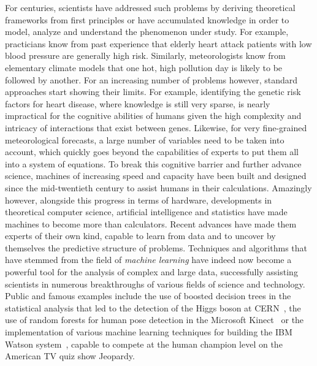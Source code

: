 For centuries, scientists have addressed such problems by deriving theoretical
frameworks from first principles or have accumulated knowledge in order to
model, analyze and understand the pheno\-menon under study. For example,
practicians know from past experience that elderly heart attack patients with
low blood pressure are generally high risk. Similarly, meteorologists know from
elementary climate models that one hot, high pollution day is likely to be
followed by another. For an increasing number of problems however, standard
approaches start showing their limits. For example, identifying the genetic
risk factors for heart disease, where knowledge is still very sparse, is nearly
impractical for the cognitive abilities of humans given the high complexity and
intricacy of interactions that exist between genes. Likewise, for very
fine-grained meteorological forecasts, a large number of variables need to be taken
into account, which quickly goes beyond the capabilities of experts to put them
all into a system of equations. To break this cognitive barrier and further
advance science, machines of increasing speed and capacity have been built and
designed since the mid-twentieth century to assist humans in their
calculations. Amazingly however, alongside this progress in terms of hardware,
developments in theoretical computer science, artificial intelligence and
statistics have made machines to become more than calculators. Recent advances
have made them experts of their own kind, capable to learn from data and to
uncover by themselves the predictive structure of problems. Techniques and
algorithms that have stemmed from the field of {\it machine learning} have
indeed now become a powerful tool for the analysis of complex and large data,
successfully assisting scientists in numerous breakthroughs of various fields
of science and technology. Public and famous examples include the use of
boosted decision trees in the statistical analysis that led to the detection of
the Higgs boson at CERN~\citep{chatrchyan:2012}, the use of random forests for
human pose detection in the Microsoft Kinect~\citep{criminisi:2013} or the
implementation of various machine learning techniques for building the IBM
Watson system~\citep{ferrucci:2010}, capable to compete at the human champion
level on the American TV quiz show Jeopardy.

